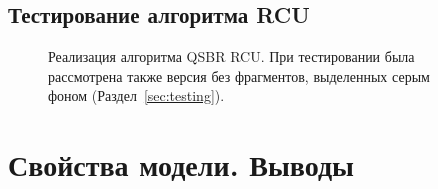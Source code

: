 \subsection{Тестирование алгоритма RCU}


\begin{figure*}[t]

\caption[Реализация алгоритма QSBR RCU]
{Реализация алгоритма QSBR RCU.
 При тестировании была рассмотрена также версия без фрагментов, выделенных серым фоном
 (Раздел~\ref{sec:testing}).}
\label{fig:rcuProg}
\end{figure*}

\section{Свойства модели. Выводы}
